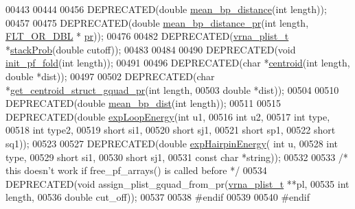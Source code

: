 \begin{DoxyCode}
00443 
00444 
00456 DEPRECATED(\textcolor{keywordtype}{double}  \hyperlink{group__pf__fold_ga79cbc375af65f11609feb6b055269e7d}{mean\_bp\_distance}(\textcolor{keywordtype}{int} length));
00457 
00475 DEPRECATED(\textcolor{keywordtype}{double} \hyperlink{group__pf__fold_gad5ba36cef8d01cf4244cc09b9bf1ce1d}{mean\_bp\_distance\_pr}(\textcolor{keywordtype}{int} length, \hyperlink{group__data__structures_ga31125aeace516926bf7f251f759b6126}{FLT\_OR\_DBL} *
      \hyperlink{fold__vars_8h_ac98ec419070aee6831b44e5c700f090f}{pr}));
00476 
00482 DEPRECATED(\hyperlink{group__data__structures_structvrna__plist__s}{vrna\_plist\_t} *\hyperlink{part__func_8h_ae856dd7a8d75c471c07153882bf1db48}{stackProb}(\textcolor{keywordtype}{double} cutoff));
00483 
00484 
00490 DEPRECATED(\textcolor{keywordtype}{void} \hyperlink{part__func_8h_a15176e23eceeff8c7d14eabcfec8a2af}{init\_pf\_fold}(\textcolor{keywordtype}{int} length));
00491 
00496 DEPRECATED(\textcolor{keywordtype}{char} *\hyperlink{part__func_8h_ae89a63bd83e75a80b2ba36d20b31ce81}{centroid}(\textcolor{keywordtype}{int} length, \textcolor{keywordtype}{double} *dist));
00497 
00502 DEPRECATED(\textcolor{keywordtype}{char} *\hyperlink{part__func_8h_a4e99e951dfdc006fe56c3a59374378ed}{get\_centroid\_struct\_gquad\_pr}(\textcolor{keywordtype}{int} length,
00503                                   \textcolor{keywordtype}{double} *dist));
00504 
00510 DEPRECATED(\textcolor{keywordtype}{double} \hyperlink{part__func_8h_ae9556ba7ded44fe2321b6f67c3fc02a3}{mean\_bp\_dist}(\textcolor{keywordtype}{int} length));
00511 
00515 DEPRECATED(\textcolor{keywordtype}{double} \hyperlink{part__func_8h_a68ba6f3a48e08ca131ab54621ce3a2d7}{expLoopEnergy}(\textcolor{keywordtype}{int} u1,
00516                                 \textcolor{keywordtype}{int} u2,
00517                                 \textcolor{keywordtype}{int} type,
00518                                 \textcolor{keywordtype}{int} type2,
00519                                 \textcolor{keywordtype}{short} si1,
00520                                 \textcolor{keywordtype}{short} sj1,
00521                                 \textcolor{keywordtype}{short} sp1,
00522                                 \textcolor{keywordtype}{short} sq1));
00523 
00527 DEPRECATED(\textcolor{keywordtype}{double} \hyperlink{part__func_8h_a7b6ab474cc80accc48010ccfcc59f96b}{expHairpinEnergy}( \textcolor{keywordtype}{int} u,
00528                                     \textcolor{keywordtype}{int} type,
00529                                     \textcolor{keywordtype}{short} si1,
00530                                     \textcolor{keywordtype}{short} sj1,
00531                                     \textcolor{keyword}{const} \textcolor{keywordtype}{char} *\textcolor{keywordtype}{string}));
00532 
00533 \textcolor{comment}{/* this doesn't work if free\_pf\_arrays() is called before */}
00534 DEPRECATED(\textcolor{keywordtype}{void} assign\_plist\_gquad\_from\_pr(\hyperlink{group__data__structures_structvrna__plist__s}{vrna\_plist\_t} **pl,
00535                                 \textcolor{keywordtype}{int} length,
00536                                 \textcolor{keywordtype}{double} cut\_off));
00537 
00538 \textcolor{preprocessor}{#endif}
00539 
00540 \textcolor{preprocessor}{#endif}
\end{DoxyCode}

